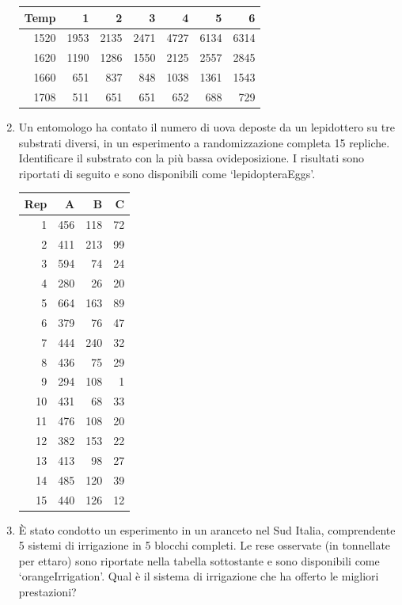 \documentclass[
  12pt,
]{book}
\begin{document}
\begin{enumerate}
  \begin{longtable}[]{@{}rrrrrrr@{}}
  \toprule()
  Temp & 1 & 2 & 3 & 4 & 5 & 6 \\
  \midrule()
  \endhead
  1520 & 1953 & 2135 & 2471 & 4727 & 6134 & 6314 \\
  1620 & 1190 & 1286 & 1550 & 2125 & 2557 & 2845 \\
  1660 & 651 & 837 & 848 & 1038 & 1361 & 1543 \\
  1708 & 511 & 651 & 651 & 652 & 688 & 729 \\
  \bottomrule()
  \end{longtable}
\item
  Un entomologo ha contato il numero di uova deposte da un lepidottero su tre substrati diversi, in un esperimento a randomizzazione completa 15 repliche. Identificare il substrato con la più bassa ovideposizione. I risultati sono riportati di seguito e sono disponibili come `lepidopteraEggs'.

  \begin{longtable}[]{@{}rrrr@{}}
  \toprule()
  Rep & A & B & C \\
  \midrule()
  \endhead
  1 & 456 & 118 & 72 \\
  2 & 411 & 213 & 99 \\
  3 & 594 & 74 & 24 \\
  4 & 280 & 26 & 20 \\
  5 & 664 & 163 & 89 \\
  6 & 379 & 76 & 47 \\
  7 & 444 & 240 & 32 \\
  8 & 436 & 75 & 29 \\
  9 & 294 & 108 & 1 \\
  10 & 431 & 68 & 33 \\
  11 & 476 & 108 & 20 \\
  12 & 382 & 153 & 22 \\
  13 & 413 & 98 & 27 \\
  14 & 485 & 120 & 39 \\
  15 & 440 & 126 & 12 \\
  \bottomrule()
  \end{longtable}
\item
  È stato condotto un esperimento in un aranceto nel Sud Italia, comprendente 5 sistemi di irrigazione in 5 blocchi completi. Le rese osservate (in tonnellate per ettaro) sono riportate nella tabella sottostante e sono disponibili come `orangeIrrigation'. Qual è il sistema di irrigazione che ha offerto le migliori prestazioni?


\end{enumerate}
\end{document}

